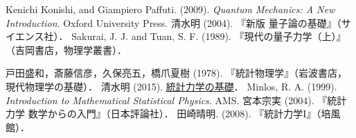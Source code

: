 \documentclass[uplatex,dvipdfmx]{jsreport}
\begin{document}
\begin{thebibliography}{99}
    Kenichi Konishi, and Giampiero Paffuti. (2009). \textit{Quantum Mechanics: A New Introduction}. Oxford University Press.
    清水明 (2004). 『新版 量子論の基礎』（サイエンス社）．
    Sakurai, J. J. and Tuan, S. F. (1989). 『現代の量子力学（上）』（吉岡書店，物理学叢書）．

    戸田盛和，斎藤信彦，久保亮五，橋爪夏樹 (1978). 『統計物理学』（岩波書店，現代物理学の基礎）．
    清水明 (2015). \href{https://as2.c.u-tokyo.ac.jp/lecture_note/statmech.pdf}{統計力学の基礎}．
    Minlos, R. A. (1999). \textit{Introduction to Mathematical Statistical Physics}. AMS.
    宮本宗実 (2004). 『統計力学 数学からの入門』（日本評論社）．
    田崎晴明. (2008). 『統計力学I』（培風館）．
\end{thebibliography}
\end{document}

